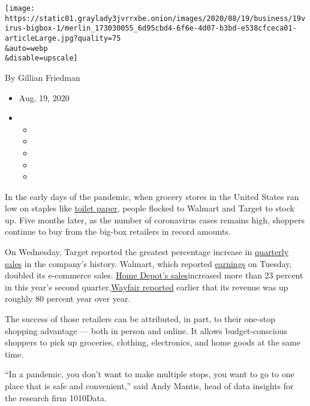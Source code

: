 \texttt{[image: https://static01.graylady3jvrrxbe.onion/images/2020/08/19/business/19virus-bigbox-1/merlin\_173030055\_6d95cbd4-6f6e-4d07-b3bd-e538cfceca01-articleLarge.jpg?quality=75\\\&auto=webp\\\&disable=upscale]}

By Gillian Friedman

\begin{itemize}
\item
  Aug. 19, 2020
\item
  \begin{itemize}
  \item
  \item
  \item
  \item
  \item
  \end{itemize}
\end{itemize}

In the early days of the pandemic, when grocery stores in the United
States ran low on staples like
\href{https://www.nytimes3xbfgragh.onion/2020/03/13/business/toilet-paper-shortage.html?searchResultPosition=1}{toilet
paper}, people flocked to Walmart and Target to stock up. Five months
later, as the number of coronavirus cases remains high, shoppers
continue to buy from the big-box retailers in record amounts.

On Wednesday, Target reported the greatest percentage increase in
\href{https://investors.target.com/news-releases/news-release-details/target-corporation-reports-second-quarter-earnings\#:~:text=The\%20Company\%20reported\%20GAAP\%20earnings,compared\%20with\%20\%241.82\%20in\%202019.}{quarterly
sales} in the company's history. Walmart, which reported
\href{https://corporate.walmart.com/newsroom/2020/08/18/walmart-releases-q2-fy21-earnings}{earnings}
on Tuesday, doubled its e-commerce sales.
\href{https://ir.homedepot.com/~/media/Files/H/HomeDepot-IR/reports-and-presentations/quarterly-earnings/q2-2020-press-release.pdf}{Home
Depot's sales}increased more than 23 percent in this year's second
quarter.\href{https://s24.q4cdn.com/589059658/files/doc_financials/2020/q2/Q2-2020-Press-Release.pdf}{Wayfair
reported} earlier that its revenue was up roughly 80 percent year over
year.

The success of those retailers can be attributed, in part, to their
one-stop shopping advantage --- both in person and online. It allows
budget-conscious shoppers to pick up groceries, clothing, electronics,
and home goods at the same time.

``In a pandemic, you don't want to make multiple stops, you want to go
to one place that is safe and convenient,'' said Andy Mantis, head of
data insights for the research firm 1010Data.

